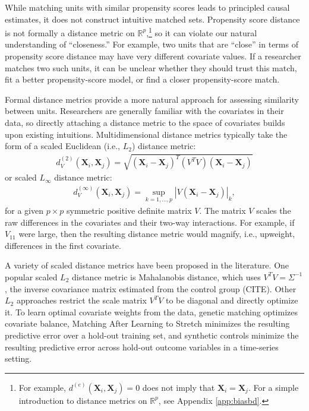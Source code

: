 \documentclass{article}
\newcommand{\bX}{\mathbf{X}}
\begin{document}
While matching units with similar propensity scores leads to principled causal estimates, it does not construct intuitive matched sets.
Propensity score distance is not formally a distance metric on $\mathbb{R}^p$,\footnote{For example, $d^{(e)}(\bX_i, \bX_j) = 0$ does not imply that $\bX_i = \bX_j$.
For a simple introduction to distance metrics on $\mathbb{R}^p$, see Appendix \ref{app:biasbd}.}
so it can violate our natural understanding of ``closeness.''
For example, two units that are ``close'' in terms of propensity score distance may have very different covariate values.
If a researcher matches two such units, it can be unclear whether they should trust this match, fit a better propensity-score model, or find a closer propensity-score match.

Formal distance metrics provide a more natural approach for assessing similarity between units.
Researchers are generally familiar with the covariates in their data, 
so directly attaching a distance metric to the space of covariates builds upon existing intuitions.
Multidimensional distance metrics typically take the form of a scaled Euclidean (i.e., $L_2$) distance metric:
\begin{align}
\label{eq:l2dist}
    d^{(2)}_V(\bX_i, \bX_j) = \sqrt{(\bX_i - \bX_j)^T (V^T V) (\bX_i - \bX_j)}
\end{align}
or scaled $L_\infty$ distance metric:
\begin{align}
\label{eq:linfdist}
    d^{(\infty)}_V(\bX_i, \bX_j) 
    = \sup_{k = 1, \dots, p} |V (\bX_i - \bX_j)|_k,
\end{align}
for a given $p \times p$ symmetric positive definite matrix $V$.
The matrix $V$ scales the raw differences in the covariates and their two-way interactions.
For example, if $V_{11}$ were large, then the resulting distance metric would magnify, i.e., upweight, differences in the first covariate.

A variety of scaled distance metrics have been proposed in the literature.
One popular scaled $L_2$ distance metric is Mahalanobis distance, which uses $V^T V = \Sigma^{-1}$, the inverse covariance matrix estimated from the control group (CITE).
Other $L_2$ approaches restrict the scale matrix $V^T V$ to be diagonal and directly optimize it.
To learn optimal covariate weights from the data, genetic matching \citep{diamond2013genetic} optimizes covariate balance, Matching After Learning to Stretch \citep{parikh2022malts} minimizes the resulting predictive error over a hold-out training set, and synthetic controls \citep{abadie2010synthetic} minimize the resulting predictive error across hold-out outcome variables in a time-series setting.
\end{document}
